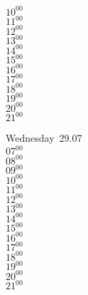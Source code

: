 \documentclass[11pt,a4paper]{book}\usepackage[]{graphicx}\usepackage[]{color}
\begin{document}
{{{\begin{tcolorbox}
{$10^{00}$\\
$11^{00}$\\
$12^{00}$\\
$13^{00}$\\
$14^{00}$\\
$15^{00}$\\
$16^{00}$\\
$17^{00}$\\
$18^{00}$\\
$19^{00}$\\
$20^{00}$\\
$21^{00}$}\\
\end{tcolorbox}
%
\begin{tcolorbox}
Wednesday~29.07\\
{ 
$07^{00}$\\
$08^{00}$\\
$09^{00}$\\
$10^{00}$\\
$11^{00}$\\
$12^{00}$\\
$13^{00}$\\
$14^{00}$\\
$15^{00}$\\
$16^{00}$\\
$17^{00}$\\
$18^{00}$\\
$19^{00}$\\
$20^{00}$\\
$21^{00}$}\\
\end{tcolorbox}
\clearpage
%
}}}
\end{document}
